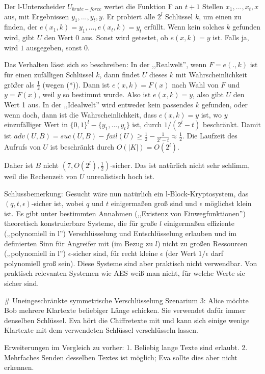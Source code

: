 \documentclass[a4paper]{article}
\begin{document}
\begin{multicols}{3}
Der l-Unterscheider $U_{brute-force}$ wertet die Funktion F an $t+1$ Stellen $x_1,...,x_t,x$ aus, mit Ergebnissen $y_1,...,y_t,y$. Er probiert alle $2^l$ Schlüssel $k$, um einen zu finden, der $e(x_1,k)=y_1 ,...,e(x_t,k) =y_t$ erfüllt. Wenn kein solches $k$ gefunden wird, gibt $U$ den Wert $0$ aus. 
Sonst wird getestet, ob $e(x,k)=y$ ist. Falls ja, wird $1$ ausgegeben, sonst $0$.

Das Verhalten lässt sich so beschreiben: In der ,,Realwelt'', wenn $F=e(.,k)$ ist für einen zufälligen Schlüssel $k$, dann findet $U$  dieses $k$ mit Wahrscheinlichkeit größer als $\frac{1}{2}$ (wegen (*)). Dann ist $e(x,k) =F(x)$ nach Wahl von $F$ und $y=F(x)$, weil $y$ so bestimmt wurde.
Also ist $e(x,k) =y$, also gibt $U$ den Wert 1 aus. In der ,,Idealwelt'' wird entweder kein passendes $k$ gefunden, oder wenn doch, dann ist die Wahrscheinlichkeit, dass $e(x,k) =y$ ist, wo $y$ einzufälliger Wert in $\{0,1\}^l-\{y_1,...,y_t\}$ ist, durch $1/(2^l-t)$ beschränkt. Damit ist $adv(U,B) = suc(U,B)-fail(U)\geq \frac{1}{2}-\frac{1}{2^l-t}\approx\frac{1}{2}$.  
Die Laufzeit des Aufrufs von $U$ ist beschränkt durch $O(|K|) =O(2^l)$.

Daher ist $B$ nicht $(7, O(2^l),\frac{1}{2})$-sicher. Das ist natürlich nicht sehr schlimm, weil die Rechenzeit von $U$ unrealistisch hoch ist.

Schlussbemerkung: Gesucht wäre nun natürlich ein l-Block-Kryptosystem, das $(q,t,\epsilon)$-sicher ist, wobei $q$ und $t$ einigermaßen groß sind und $\epsilon$ möglichst klein ist. Es gibt unter bestimmten Annahmen (,,Existenz von Einwegfunktionen'') theoretisch konstruierbare Systeme, die für große $l$ einigermaßen effiziente (,,polynomiell in l'') Verschlüsselung und Entschlüsselung erlauben und im definierten Sinn für Angreifer mit (im Bezug zu $l$) nicht zu großen Ressourcen (,,polynomiell in l'') $\epsilon$-sicher sind, für recht kleine $\epsilon$ (der Wert $1/\epsilon$ darf polynomiell groß sein). Diese Systeme sind aber praktisch nicht verwendbar. Von praktisch relevanten Systemen wie AES weiß man nicht, für welche Werte sie sicher sind.

# Uneingeschränkte symmetrische Verschlüsselung
Szenarium 3: Alice möchte Bob mehrere Klartexte beliebiger Länge schicken. Sie verwendet dafür immer denselben Schlüssel. Eva hört die Chiffretexte mit und kann sich einige wenige Klartexte mit dem verwendeten Schlüssel verschlüsseln lassen.

Erweiterungen im Vergleich zu vorher:
1. Beliebig lange Texte sind erlaubt.
2. Mehrfaches Senden desselben Textes ist möglich; Eva sollte dies aber nicht erkennen.


\end{multicols}
\end{document}
